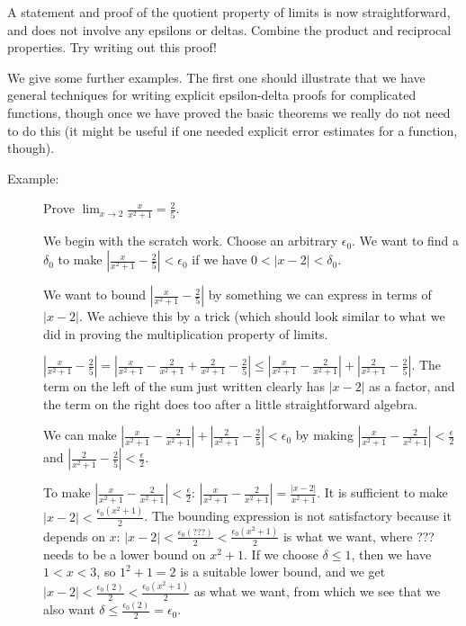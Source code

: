 \documentclass[12pt]{article}
\begin{document}
A statement and proof of the quotient property of limits is now straightforward, and does not involve any epsilons or deltas.  Combine the product and reciprocal properties.  Try writing out this proof!

We give some further examples.  The first one should illustrate that we have general techniques for writing explicit epsilon-delta proofs for complicated functions, though once we have proved the basic theorems we really do not need to do this (it might be useful if one needed explicit error estimates for a function, though).

\begin{description}

\item[Example:] Prove  $\lim_{x \rightarrow 2}\frac{x}{x^2+1}=\frac25$.

We begin with the scratch work.  Choose an arbitrary $\epsilon_0$.  We want to find a $\delta_0$ to
make $|\frac{x}{x^2+1}-\frac25|<\epsilon_0$ if we have $0<|x-2|<\delta_0$.

We want to bound $|\frac{x}{x^2+1}-\frac25|$ by something we can express in terms of $|x-2|$.  We achieve
this by a trick (which should look similar to what we did in proving the multiplication property of limits.

$|\frac{x}{x^2+1}-\frac25| = |\frac{x}{x^2+1}-\frac{2}{x^2+1}+\frac{2}{x^2+1}-\frac25| \leq
|\frac{x}{x^2+1}-\frac{2}{x^2+1}|+|\frac{2}{x^2+1}-\frac25|$.  The term on the left of the sum just written clearly has $|x-2|$ as a factor, and the term on the right does too after a little straightforward algebra.

We can make $|\frac{x}{x^2+1}-\frac{2}{x^2+1}|+|\frac{2}{x^2+1}-\frac25|<\epsilon_0$ by making
$|\frac{x}{x^2+1}-\frac{2}{x^2+1}|<\frac{\epsilon}2$  and $|\frac{2}{x^2+1}-\frac25|<\frac{\epsilon}2$.

To make $|\frac{x}{x^2+1}-\frac{2}{x^2+1}|<\frac{\epsilon}2$:  $|\frac{x}{x^2+1}-\frac{2}{x^2+1}|=
\frac{|x-2|}{x^2+1}$.  It is sufficient to make $|x-2|<\frac{\epsilon_0(x^2+1)}{2}$.  The bounding expression is not satisfactory because it depends on $x$:  $|x-2|<\frac{\epsilon_0(???)}{2}<\frac{\epsilon_0(x^2+1)}{2}$ is what we want, where ??? needs to be a lower bound on $x^2+1$.  If we choose $\delta \leq 1$, then we have
$1<x<3$, so $1^2+1=2$  is a suitable lower bound, and we get  $|x-2|<\frac{\epsilon_0(2)}{2}<\frac{\epsilon_0(x^2+1)}{2}$
as what we want, from which we see that we also want $\delta \leq \frac{\epsilon_0(2)}{2}=\epsilon_0$.


\end{description}
\end{document}
